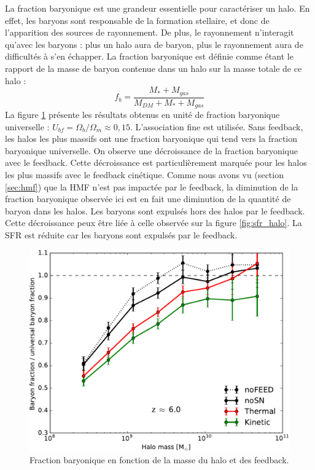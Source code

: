 La fraction baryonique est une grandeur essentielle pour caractériser un halo.
En effet, les baryons sont responsable de la formation stellaire, et donc de l'apparition des sources de rayonnement.
De plus, le rayonnement n'interagit qu'avec les baryons : plus un halo aura de baryon, plus le rayonnement aura de difficultés à s'en échapper.
La fraction baryonique est définie comme étant le rapport de la masse de baryon contenue dans un halo sur la masse totale de ce halo : 
\begin{equation}
f_b = \frac{M_* + M_{gas} }{M_{DM} + M_* + M_{gas} }
\end{equation}
La figure \ref{fig:bfrac} présente les résultats obtenus en unité de fraction baryonique universelle : $U_{bf}= \Omega_b/\Omega_m \approx 0,15$.
L'association fine est utilisée.
Sans feedback, les halos les plus massifs ont une fraction baryonique qui tend vers la fraction baryonique universelle.
On observe une décroissance de la fraction baryonique avec le feedback.
Cette décroissance est particulièrement marquée pour les halos les plus massifs avec le feedback cinétique.
Comme nous avons vu (section \ref{sec:hmf}) que la \ac{HMF} n'est pas impactée par le feedback, la diminution de la fraction baryonique observée ici est en fait une diminution de la quantité de baryon dans les halos.
Les baryons sont expulsés hors des halos par le feedback.
Cette décroissance peux être liée à celle observée sur la figure \ref{fig:sfr_halo}.
La \ac{SFR} est réduite car les baryons sont expulsés par le feedback.


\begin{figure}
		\includegraphics[width=.95\linewidth]{img/03/baryon_frac.pdf}
        \caption[Fraction baryonique]{Fraction baryonique en fonction de la masse du halo et des feedback.
 		\label{fig:bfrac}}
\end{figure}


